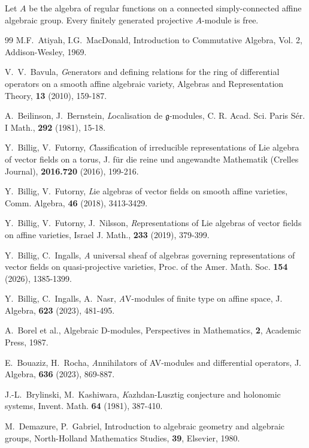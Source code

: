 \documentclass[12pt]{amsart}
\begin{document}
\begin{conjecture}
Let $A$ be the algebra of regular functions on a connected simply-connected affine algebraic group. Every finitely generated projective $A$-module is free.
\end{conjecture}

\begin{thebibliography}{99}
M.F.~Atiyah, I.G.~MacDonald, 
Introduction to Commutative Algebra, Vol. 2, Addison-Wesley, 1969.

V.~V.~Bavula, 
{\emph Generators and defining relations for the ring of differential operators on a smooth affine algebraic variety}, 
Algebras and Representation Theory, {\bf 13} (2010), 159-187.

A.~Beilinson, J.~Bernstein,
{\emph Localisation de \(\mathfrak{g}\)-modules},
C. R. Acad. Sci. Paris S{\'e}r. I Math., {\bf 292} (1981), 15-18.  


Y.~Billig, V.~Futorny,
{\emph Classification of irreducible representations of Lie algebra of vector fields on a torus}, 
J. f\"ur die reine und angewandte Mathematik (Crelles Journal), {\bf 2016.720} (2016), 199-216.

Y.~Billig, V.~Futorny,
{\emph Lie algebras of vector fields on smooth aﬃne varieties}, 
Comm. Algebra, {\bf 46} (2018), 3413-3429.

Y.~Billig, V.~Futorny, J.~Nilsson,
{\emph Representations of Lie algebras of vector fields on affine varieties},
Israel J. Math.,  {\bf 233} (2019), 379-399.

Y.~Billig, C.~Ingalls, 
{\emph A universal sheaf of algebras governing representations of vector fields on quasi-projective varieties}, Proc. of the Amer. Math. Soc. {\bf 154} (2026), 1385-1399.

Y.~Billig, C.~Ingalls, A.~Nasr,
{\emph AV-modules of finite type on affine space}, 
J. Algebra,  {\bf 623} (2023), 481-495.

A.~Borel et al.,
Algebraic D-modules,
Perspectives in Mathematics, {\bf 2}, Academic Press, 1987.

E.~Bouaziz, H.~Rocha,
{\emph Annihilators of AV-modules and differential operators}, 
J. Algebra, {\bf 636} (2023), 869-887.

J.-L.~Brylinski, M.~Kashiwara,
{\emph Kazhdan-Lusztig conjecture and holonomic systems}, 
Invent. Math. {\bf 64} (1981), 387-410. 

M.~Demazure, P.~Gabriel,
Introduction to algebraic geometry and algebraic groups,
North-Holland Mathematics Studies, {\bf 39}, Elsevier, 1980.


\end{thebibliography}
\end{document}
